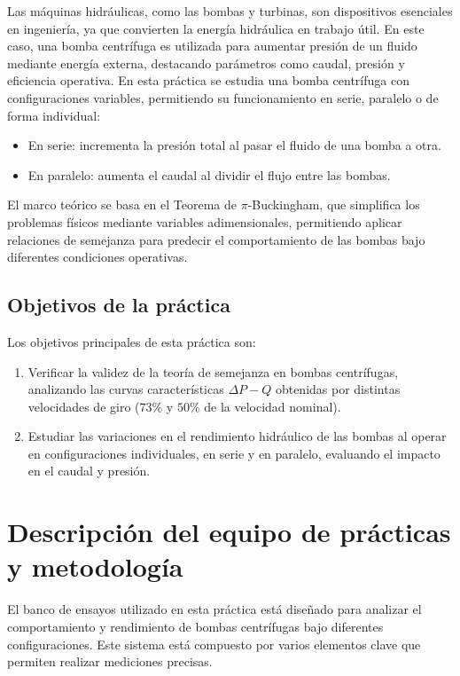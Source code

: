 \documentclass[10pt]{IEEEtran}
\begin{document}
Las máquinas hidráulicas, como las bombas y turbinas, son dispositivos esenciales en ingeniería, ya que convierten la energía hidráulica en trabajo útil. En este caso, una bomba centrífuga es utilizada para aumentar presión de un fluido mediante energía externa, destacando parámetros como caudal, presión y eficiencia operativa. En esta práctica se estudia una bomba centrífuga con configuraciones variables, permitiendo su funcionamiento en serie, paralelo o de forma individual:

\begin{itemize}
  \item En serie: incrementa la presión total al pasar el fluido de una bomba a otra.
  \item En paralelo: aumenta el caudal al dividir el flujo entre las bombas.
\end{itemize}

El marco teórico se basa en el Teorema de $\pi$-Buckingham, que simplifica los problemas físicos mediante variables adimensionales, permitiendo aplicar relaciones de semejanza para predecir el comportamiento de las bombas bajo diferentes condiciones operativas.

\subsection{Objetivos de la práctica}
Los objetivos principales de esta práctica son:
\begin{enumerate}
  \item Verificar la validez de la teoría de semejanza en bombas centrífugas, analizando las curvas características $\Delta P - Q$ obtenidas por distintas velocidades de giro ($73\%$ y $50\%$ de la velocidad nominal).
  \item Estudiar las variaciones en el rendimiento hidráulico de las bombas al operar en configuraciones individuales, en serie y en paralelo, evaluando el impacto en el caudal y presión. 
\end{enumerate}

\section{Descripción del equipo de prácticas y metodología}

El banco de ensayos utilizado en esta práctica está diseñado para analizar el comportamiento y rendimiento de bombas centrífugas bajo diferentes configuraciones. Este sistema está compuesto por varios elementos clave que permiten realizar mediciones precisas.
\end{document}
